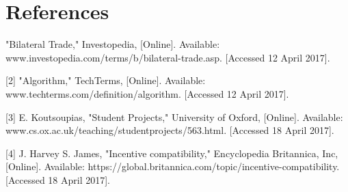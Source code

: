 \documentclass[12pt,a4paper]{article}
\begin{document}
\section{References}
\begin{bibliography}
[[1] 	"Bilateral Trade," Investopedia, [Online]. Available: www.investopedia.com/terms/b/bilateral-trade.asp. [Accessed 12 April 2017].
	
[2] 	"Algorithm," TechTerms, [Online]. Available: www.techterms.com/definition/algorithm. [Accessed 12 April 2017].
	
[3] 	E. Koutsoupias, "Student Projects," University of Oxford, [Online]. Available: www.cs.ox.ac.uk/teaching/studentprojects/563.html. [Accessed 18 April 2017].
	
[4] 	J. Harvey S. James, "Incentive compatibility," Encyclopedia Britannica, Inc, [Online]. Available: https://global.britannica.com/topic/incentive-compatibility. [Accessed 18 April 2017].	
\end{bibliography}
\end{document}
